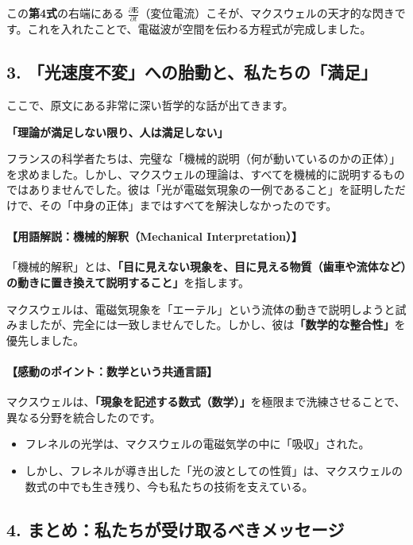 \documentclass[a4paper,11pt,openany]{ltjsbook}
\begin{document}
\begin{lecturebox}
この\textbf{第4式}の右端にある $\frac{\partial \mathbf{E}}{\partial t}$（変位電流）こそが、マクスウェルの天才的な閃きです。これを入れたことで、電磁波が空間を伝わる方程式が完成しました。

\subsection*{3. 「光速度不変」への胎動と、私たちの「満足」}

ここで、原文にある非常に深い哲学的な話が出てきます。

\textbf{「理論が満足しない限り、人は満足しない」}

フランスの科学者たちは、完璧な「機械的説明（何が動いているのかの正体）」を求めました。しかし、マクスウェルの理論は、すべてを機械的に説明するものではありませんでした。彼は「光が電磁気現象の一例であること」を証明しただけで、その「中身の正体」まではすべてを解決しなかったのです。

\paragraph{【用語解説：機械的解釈（Mechanical Interpretation）】}
「機械的解釈」とは、\textbf{「目に見えない現象を、目に見える物質（歯車や流体など）の動きに置き換えて説明すること」}を指します。

マクスウェルは、電磁気現象を「エーテル」という流体の動きで説明しようと試みましたが、完全には一致しませんでした。しかし、彼は\textbf{「数学的な整合性」}を優先しました。

\paragraph{【感動のポイント：数学という共通言語】}
マクスウェルは、\textbf{「現象を記述する数式（数学）」}を極限まで洗練させることで、異なる分野を統合したのです。

\begin{itemize}[leftmargin=2em]
\item フレネルの光学は、マクスウェルの電磁気学の中に「吸収」された。
\item しかし、フレネルが導き出した「光の波としての性質」は、マクスウェルの数式の中でも生き残り、今も私たちの技術を支えている。
\end{itemize}

\subsection*{4. まとめ：私たちが受け取るべきメッセージ}


\end{lecturebox}
\end{document}
